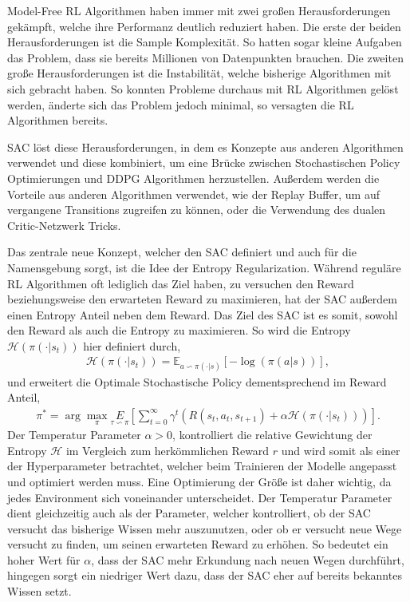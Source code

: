 \documentclass[]{iat}
\begin{document}
Model-Free RL Algorithmen haben immer mit zwei großen Herausforderungen gekämpft, welche ihre Performanz deutlich reduziert haben. Die erste der beiden Herausforderungen ist die Sample Komplexität. So hatten sogar kleine Aufgaben das Problem, dass sie bereits Millionen von Datenpunkten brauchen. Die zweiten große Herausforderungen ist die Instabilität, welche bisherige Algorithmen mit sich gebracht haben. So konnten Probleme durchaus mit RL Algorithmen gelöst werden, änderte sich das Problem jedoch minimal, so versagten die RL Algorithmen bereits. \cite[]{sacv2}

SAC löst diese Herausforderungen, in dem es Konzepte aus anderen Algorithmen verwendet und diese kombiniert, um eine Brücke zwischen Stochastischen Policy Optimierungen und DDPG Algorithmen herzustellen. Außerdem werden die Vorteile aus anderen Algorithmen verwendet, wie der Replay Buffer, um auf vergangene Transitions zugreifen zu können, oder die Verwendung des dualen Critic-Netzwerk Tricks. \cite[]{brockman2016openai}

Das zentrale neue Konzept, welcher den SAC definiert und auch für die Namensgebung sorgt, ist die Idee der Entropy Regularization. Während reguläre RL Algorithmen oft lediglich das Ziel haben, zu versuchen den Reward beziehungsweise den erwarteten Reward zu maximieren, hat der SAC außerdem einen Entropy Anteil neben dem Reward. Das Ziel des SAC ist es somit, sowohl den Reward als auch die Entropy zu maximieren. So wird die Entropy $\mathcal{H}(\pi(\cdot | s_t))$ hier definiert durch,
\begin{align}
    \mathcal{H}(\pi(\cdot | s_t)) = \mathbb{E}_{a\backsim \pi(\cdot | s)}[-\log(\pi(a|s))],
\end{align}
und erweitert die Optimale Stochastische Policy dementsprechend im Reward Anteil,
\begin{align}
    \pi^* = \arg \max_{\pi} \underset{\tau \backsim \pi}{E} \left[\sum_{t=0}^{\infty} \gamma^t\left(R(s_t, a_t, s_{t+1}) + \alpha \mathcal{H}(\pi(\cdot | s_t))\right)  \right].
\end{align}
Der Temperatur Parameter $\alpha > 0$, kontrolliert die relative Gewichtung der Entropy $\mathcal{H}$ im Vergleich zum herkömmlichen Reward $r$ und wird somit als einer der Hyperparameter betrachtet, welcher beim Trainieren der Modelle angepasst und optimiert werden muss. Eine Optimierung der Größe ist daher wichtig, da jedes Environment sich voneinander unterscheidet. Der Temperatur Parameter dient gleichzeitig auch als der Parameter, welcher kontrolliert, ob der SAC versucht das bisherige Wissen mehr auszunutzen, oder ob er versucht neue Wege versucht zu finden, um seinen erwarteten Reward zu erhöhen. So bedeutet ein hoher Wert für $\alpha$, dass der SAC mehr Erkundung nach neuen Wegen durchführt, hingegen sorgt ein niedriger Wert dazu, dass der SAC eher auf bereits bekanntes Wissen setzt.
\end{document}
